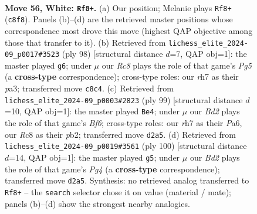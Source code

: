 \documentclass[11pt]{article}
\begin{document}
\clearpage

\begin{figure}[p]\centering
\begin{subfigure}{0.46\textwidth}\centering
\resizebox{\linewidth}{!}{%
\newchessgame
\chessboard[
  setfen={2R5/7r/3P1k2/1p6/4K3/r7/1p1B4/8 w - - 0 56},
  showmover=false,
  pgfstyle=straightmove, color=movearrow, markmove={c8-f8}
]}
\caption{}
\end{subfigure}\hfill
\begin{subfigure}{0.46\textwidth}\centering
\resizebox{\linewidth}{!}{%
\newchessgame
\chessboard[
  setfen={8/5p2/8/4k1P1/1r6/p4K2/P1B5/8 w - - 0 50},
  showmover=false,
  pgfstyle=straightmove, color=movearrow, markmove={g5-g6}
]}
\caption{}
\end{subfigure}
\\[4pt]
\begin{subfigure}{0.46\textwidth}\centering
\resizebox{\linewidth}{!}{%
\newchessgame
\chessboard[
  setfen={6R1/8/p4K1k/P7/2p4p/5b2/1P6/8 b - - 1 50},
  showmover=false,
  pgfstyle=straightmove, color=movearrow, markmove={f3-e4}
]}
\caption{}
\end{subfigure}\hfill
\begin{subfigure}{0.46\textwidth}\centering
\resizebox{\linewidth}{!}{%
\newchessgame
\chessboard[
  setfen={8/8/4k1Pp/R7/4K1P1/8/8/3r4 w - - 1 51},
  showmover=false,
  pgfstyle=straightmove, color=movearrow, markmove={g4-g5}
]}
\caption{}
\end{subfigure}
\caption{\textbf{Move 56, White: \texttt{Rf8+}.} (a) Our position; Melanie plays \texttt{Rf8+} (\texttt{c8f8}). Panels (b)--(d) are the retrieved master positions whose correspondence most drove this move (highest QAP objective among those that transfer to it). (b) Retrieved from \texttt{lichess\_elite\_2024-09\_p0017\#3523} (ply 98) [structural distance $d$=7, QAP obj=1]: the master played \texttt{g6}; under $\mu$ our \emph{Rc8} plays the role of that game's \emph{Pg5} (a \textbf{cross-type} correspondence); cross-type roles: our \emph{r}h7 as their \emph{p}a3; transferred move \texttt{c8c4}. (c) Retrieved from \texttt{lichess\_elite\_2024-09\_p0003\#2823} (ply 99) [structural distance $d$=10, QAP obj=1]: the master played \texttt{Be4}; under $\mu$ our \emph{Bd2} plays the role of that game's \emph{Bf6}; cross-type roles: our \emph{r}h7 as their \emph{P}a6, our \emph{R}c8 as their \emph{p}b2; transferred move \texttt{d2a5}. (d) Retrieved from \texttt{lichess\_elite\_2024-09\_p0019\#3561} (ply 100) [structural distance $d$=14, QAP obj=1]: the master played \texttt{g5}; under $\mu$ our \emph{Bd2} plays the role of that game's \emph{Pg4} (a \textbf{cross-type} correspondence); transferred move \texttt{d2a5}. Synthesis: no retrieved analog transferred to \texttt{Rf8+} -- the \texttt{search} selector chose it on value (material / mate); panels (b)--(d) show the strongest nearby analogies.}
\label{fig:thought-m110}
\end{figure}
\end{document}
